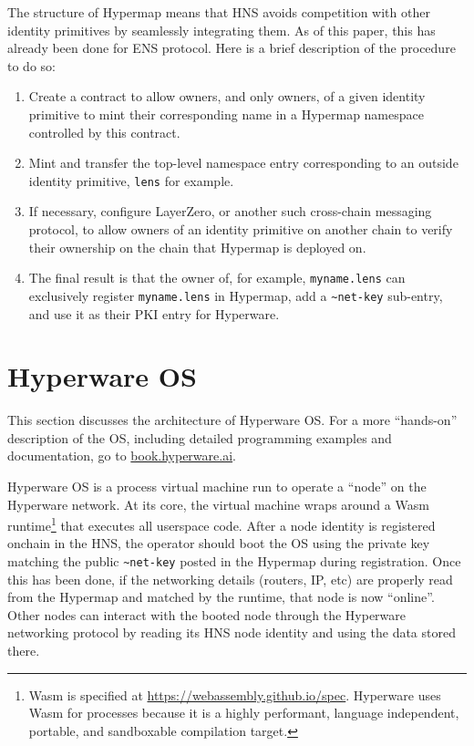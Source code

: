 \documentclass[runningheads]{llncs}
\begin{document}
The structure of Hypermap means that HNS avoids competition with other identity primitives by seamlessly integrating them.
As of this paper, this has already been done for ENS protocol.
Here is a brief description of the procedure to do so:
\begin{enumerate}
    \item Create a contract to allow owners, and only owners, of a given identity primitive to mint their corresponding name in a Hypermap namespace controlled by this contract.
    \item Mint and transfer the top-level namespace entry corresponding to an outside identity primitive, \verb|lens| for example.
    \item If necessary, configure LayerZero, or another such cross-chain messaging protocol, to allow owners of an identity primitive on another chain to verify their ownership on the chain that Hypermap is deployed on.
    \item The final result is that the owner of, for example, \verb|myname.lens| can exclusively register \verb|myname.lens| in Hypermap, add a \verb|~net-key| sub-entry, and use it as their PKI entry for Hyperware.
\end{enumerate}

\section{Hyperware OS}
\label{sec:os}

This section discusses the architecture of Hyperware OS.
For a more ``hands-on'' description of the OS, including detailed programming examples and documentation, go to \href{https://book.hyperware.ai/}{book.hyperware.ai}.

Hyperware OS is a process virtual machine run to operate a ``node'' on the Hyperware network.
At its core, the virtual machine wraps around a Wasm runtime\footnote{Wasm is specified at \url{https://webassembly.github.io/spec}. Hyperware uses Wasm for processes because it is a highly performant, language independent, portable, and sandboxable compilation target.}
that executes all userspace code.
After a node identity is registered onchain in the HNS, the operator should boot the OS using the private key matching the public \verb|~net-key| posted in the Hypermap during registration.
Once this has been done, if the networking details (routers, IP, etc) are properly read from the Hypermap and matched by the runtime, that node is now ``online''.
Other nodes can interact with the booted node through the Hyperware networking protocol by reading its HNS node identity and using the data stored there.
\end{document}
